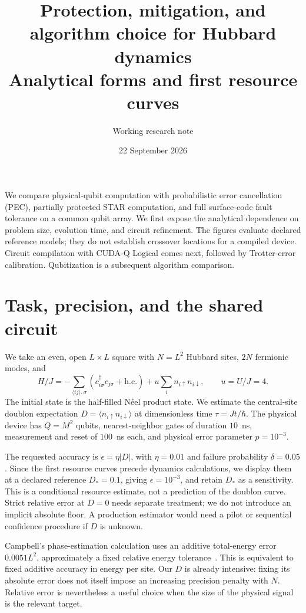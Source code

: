 \documentclass[11pt]{article}
\title{Protection, mitigation, and algorithm choice for Hubbard dynamics\\
\large Analytical forms and first resource curves}
\author{Working research note}
\date{22 September 2026}
\newcommand{\eps}{\epsilon}
\begin{document}
\maketitle

We compare physical-qubit computation with probabilistic error cancellation
(PEC), partially protected STAR computation, and full surface-code fault
tolerance on a common qubit array. We first expose the analytical dependence
on problem size, evolution time, and circuit refinement. The figures evaluate
declared reference models; they do not establish crossover locations for a
compiled device. Circuit compilation with CUDA-Q Logical comes next, followed
by Trotter-error calibration. Qubitization is a subsequent algorithm comparison.

\section{Task, precision, and the shared circuit}
We take an even, open $L\times L$ square with $N=L^2$ Hubbard sites,
$2N$ fermionic modes, and
\begin{equation}
 H/J=-\sum_{\langle ij\rangle,\sigma}
 (c^\dagger_{i\sigma}c_{j\sigma}+\mathrm{h.c.})
 +u\sum_i n_{i\uparrow}n_{i\downarrow},\qquad u=U/J=4.
\end{equation}
The initial state is the half-filled N\'eel product state. We estimate the
central-site doublon expectation $D=\langle n_{i\uparrow}n_{i\downarrow}\rangle$
at dimensionless time $\tau=Jt/\hbar$. The physical device has $Q=M^2$ qubits,
nearest-neighbor gates of duration $10$~ns, measurement and reset of $100$~ns
each, and physical error parameter $p=10^{-3}$.

The requested accuracy is $\eps=\eta |D|$, with $\eta=0.01$ and failure
probability $\delta=0.05$. Since the first resource curves precede dynamics
calculations, we display them at a declared reference $D_*=0.1$, giving
$\eps=10^{-3}$, and retain $D_*$ as a sensitivity. This is a conditional
resource estimate, not a prediction of the doublon curve. Strict relative
error at $D=0$ needs separate treatment; we do not introduce an implicit
absolute floor. A production estimator would need a pilot or sequential
confidence procedure if $D$ is unknown.

Campbell's phase-estimation calculation uses an additive total-energy error
$0.0051L^2$, approximately a fixed relative energy tolerance~\cite{campbell}.
This is equivalent to fixed additive accuracy in energy per site. Our $D$
is already intensive: fixing its absolute error does not itself impose an
increasing precision penalty with $N$. Relative error is nevertheless a useful
choice when the size of the physical signal is the relevant target.
\end{document}

